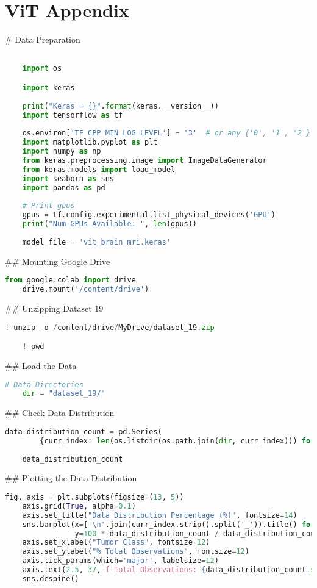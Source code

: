 \section{ViT Appendix}\label{vit_appendix}

# Data Preparation
\begin{lstlisting}[language=Python]

    import os

    import keras
    
    print("Keras = {}".format(keras.__version__))
    import tensorflow as tf
    
    os.environ['TF_CPP_MIN_LOG_LEVEL'] = '3'  # or any {'0', '1', '2'}
    import matplotlib.pyplot as plt
    import numpy as np
    from keras.preprocessing.image import ImageDataGenerator
    from keras.models import load_model
    import seaborn as sns
    import pandas as pd
    
    # Print gpus
    gpus = tf.config.experimental.list_physical_devices('GPU')
    print("Num GPUs Available: ", len(gpus))
    
    model_file = 'vit_brain_mri.keras'
\end{lstlisting}


## Mounting Google Drive
\begin{lstlisting}[language=Python]
    from google.colab import drive
    drive.mount('/content/drive')
\end{lstlisting}

## Unzipping Dataset 19
\begin{lstlisting}[language=Python]
    ! unzip -o /content/drive/MyDrive/dataset_19.zip

    ! pwd
\end{lstlisting}


## Load the Data
\begin{lstlisting}[language=Python]
    # Data Directories
    dir = "dataset_19/"
\end{lstlisting}


## Check Data Distribution
\begin{lstlisting}[language=Python]
    data_distribution_count = pd.Series(
        {curr_index: len(os.listdir(os.path.join(dir, curr_index))) for curr_index in os.listdir(dir)})
    
    data_distribution_count
\end{lstlisting}

## Plotting the Data Distribution
\begin{lstlisting}[language=Python]
    fig, axis = plt.subplots(figsize=(13, 5))
    axis.grid(True, alpha=0.1)
    axis.set_title("Data Distribution Percentage (%)", fontsize=14)
    sns.barplot(x=['\n'.join(curr_index.strip().split('_')).title() for curr_index in data_distribution_count.index],
                y=100 * data_distribution_count / data_distribution_count.sum(), ax=axis)
    axis.set_xlabel("Tumor Class", fontsize=12)
    axis.set_ylabel("% Total Observations", fontsize=12)
    axis.tick_params(which='major', labelsize=12)
    axis.text(2.5, 37, f'Total Observations: {data_distribution_count.sum()}', fontdict=dict(size=12))
    sns.despine()
\end{lstlisting}

